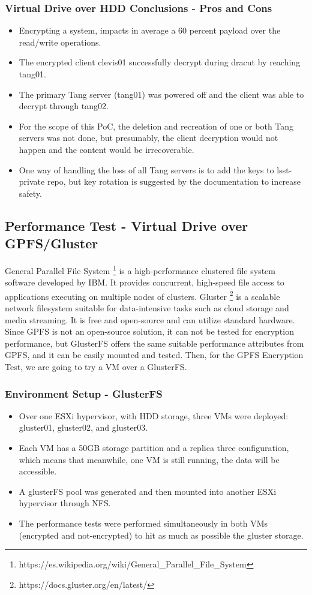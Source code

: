 \newpage
\subsubsection{Virtual Drive over HDD Conclusions - Pros and Cons}
\begin{itemize}
  \item Encrypting a system, impacts in average a 60 percent payload over the read/write operations.
  \item The encrypted client clevis01 successfully decrypt during dracut by reaching tang01.
  \item The primary Tang server (tang01) was powered off and the client was able to decrypt through tang02.
  \item For the scope of this PoC, the deletion and recreation of one or both Tang servers was not done, but presumably, the client decryption would not happen and the content would be irrecoverable.
  \item One way of handling the loss of all Tang servers is to add the keys to lsst-private repo, but key rotation is suggested by the documentation to increase safety.
\end{itemize}

\newpage
\subsection{Performance Test - Virtual Drive over GPFS/Gluster}
General Parallel File System \footnote{https://es.wikipedia.org/wiki/General\_Parallel\_File\_System} is a high-performance clustered file system software developed by IBM. It provides concurrent, high-speed file access to applications executing on multiple nodes of clusters.
Gluster \footnote{https://docs.gluster.org/en/latest/} is a scalable network filesystem suitable for data-intensive tasks such as cloud storage and media streaming. It is free and open-source and can utilize standard hardware. 
Since GPFS is not an open-source solution, it can not be tested for encryption performance, but GlusterFS offers the same suitable performance attributes from GPFS, and it can be easily mounted and tested. Then, for the GPFS Encryption Test, we are going to try a VM over a GlusterFS.

\subsubsection{Environment Setup - GlusterFS}
\begin{itemize}
  \item Over one ESXi hypervisor, with HDD storage, three VMs were deployed: gluster01, gluster02, and gluster03.
  \item Each VM has a 50GB storage partition and a replica three configuration, which means that meanwhile, one VM is still running, the data will be accessible. 
  \item A glusterFS pool was generated and then mounted into another ESXi hypervisor through NFS.
  \item The performance tests were performed simultaneously in both VMs (encrypted and not-encrypted) to hit as much as possible the gluster storage.
\end{itemize}

